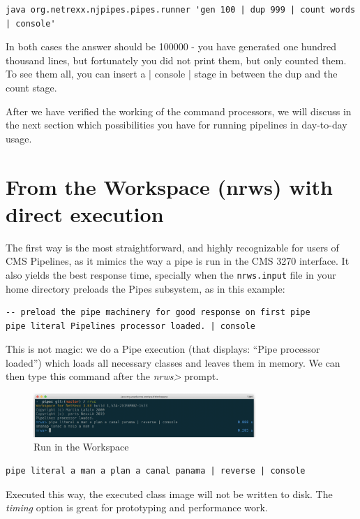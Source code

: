 \begin{lstlisting}
java org.netrexx.njpipes.pipes.runner 'gen 100 | dup 999 | count words | console'
\end{lstlisting}

In both cases the answer should be 100000 - you have generated one
hundred thousand lines, but fortunately you did not print them, but
only counted them. To see them all, you can insert a | console | stage
in between the dup and the count stage.

After we have verified the working of the command processors, we will
discuss in the next section which possibilities you have for running
pipelines in day-to-day usage.



\section{From the \nr{} Workspace (nrws) with direct execution}
The first way is the most straightforward, and highly recognizable for
users of CMS Pipelines, as it mimics the way a pipe is run in the CMS
3270 interface. It also yields the best response time, specially when
the \texttt{nrws.input} file in your home directory preloads the Pipes subsystem, as in this
example:
\begin{verbatim}
-- preload the pipe machinery for good response on first pipe
pipe literal Pipelines processor loaded. | console
\end{verbatim}
This is not magic: we do a Pipe execution (that displays: ``Pipe
processor loaded'') which loads all necessary classes and leaves them
in memory. We can then type this command after the \emph{nrws>}
prompt.
\begin{figure}[h]
  \includegraphics[width=0.75\textwidth]{images/runnrws.png}
  \caption{Run in the \nr{} Workspace}
  \label{fig:runnrws}
\end{figure}

\begin{lstlisting}
pipe literal a man a plan a canal panama | reverse | console
\end{lstlisting}
Executed this way, the executed class image will not be written to
disk. The \emph{timing} option is great for prototyping and
performance work.
